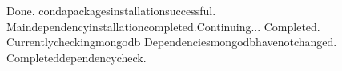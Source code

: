\documentclass[a4paper,11pt,english]{sphinxmanual}
\begin{document}
\begin{sphinxVerbatim}[commandchars=\\\{\}]
Done.
condapackagesinstallationsuccessful.
\PYGZhy{}\PYGZhy{}\PYGZhy{}\PYGZhy{}\PYGZhy{}\PYGZhy{}\PYGZhy{}\PYGZhy{}\PYGZhy{}\PYGZhy{}\PYGZhy{}\PYGZhy{}\PYGZhy{}\PYGZhy{}\PYGZhy{}\PYGZhy{}\PYGZhy{}\PYGZhy{}\PYGZhy{}\PYGZhy{}\PYGZhy{}\PYGZhy{}\PYGZhy{}\PYGZhy{}\PYGZhy{}\PYGZhy{}\PYGZhy{}\PYGZhy{}\PYGZhy{}\PYGZhy{}\PYGZhy{}\PYGZhy{}\PYGZhy{}\PYGZhy{}\PYGZhy{}\PYGZhy{}\PYGZhy{}\PYGZhy{}\PYGZhy{}\PYGZhy{}\PYGZhy{}\PYGZhy{}\PYGZhy{}\PYGZhy{}\PYGZhy{}\PYGZhy{}\PYGZhy{}\PYGZhy{}\PYGZhy{}\PYGZhy{}\PYGZhy{}\PYGZhy{}\PYGZhy{}\PYGZhy{}\PYGZhy{}\PYGZhy{}\PYGZhy{}\PYGZhy{}\PYGZhy{}\PYGZhy{}\PYGZhy{}\PYGZhy{}\PYGZhy{}\PYGZhy{}\PYGZhy{}\PYGZhy{}\PYGZhy{}\PYGZhy{}\PYGZhy{}\PYGZhy{}\PYGZhy{}\PYGZhy{}
Maindependencyinstallationcompleted.Continuing...
\PYGZhy{}\PYGZhy{}\PYGZhy{}\PYGZhy{}\PYGZhy{}\PYGZhy{}\PYGZhy{}\PYGZhy{}\PYGZhy{}\PYGZhy{}\PYGZhy{}\PYGZhy{}\PYGZhy{}\PYGZhy{}\PYGZhy{}\PYGZhy{}\PYGZhy{}\PYGZhy{}\PYGZhy{}\PYGZhy{}\PYGZhy{}\PYGZhy{}\PYGZhy{}\PYGZhy{}\PYGZhy{}\PYGZhy{}\PYGZhy{}\PYGZhy{}\PYGZhy{}\PYGZhy{}\PYGZhy{}\PYGZhy{}\PYGZhy{}\PYGZhy{}\PYGZhy{}\PYGZhy{}\PYGZhy{}\PYGZhy{}\PYGZhy{}\PYGZhy{}\PYGZhy{}\PYGZhy{}\PYGZhy{}\PYGZhy{}\PYGZhy{}\PYGZhy{}\PYGZhy{}\PYGZhy{}\PYGZhy{}\PYGZhy{}\PYGZhy{}\PYGZhy{}\PYGZhy{}\PYGZhy{}\PYGZhy{}\PYGZhy{}\PYGZhy{}\PYGZhy{}\PYGZhy{}\PYGZhy{}\PYGZhy{}\PYGZhy{}\PYGZhy{}\PYGZhy{}\PYGZhy{}\PYGZhy{}\PYGZhy{}\PYGZhy{}\PYGZhy{}\PYGZhy{}\PYGZhy{}\PYGZhy{}
Completed.
Currentlycheckingmongodb
Dependenciesmongodbhavenotchanged.
Completeddependencycheck.


\end{sphinxVerbatim}
\end{document}
